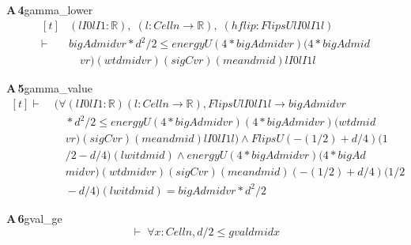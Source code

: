 \documentclass[conference]{IEEEtran}
\theoremstyle{definition}
\newcommand{\lean}[1]{\textsf{\footnotesize #1}}
\begin{document}
\noindent\textbf{A\,4}\quad\lean{gamma\_lower}
{\footnotesize\[ \begin{aligned}[t]
&(\mathit{lI0} \mathit{lI1} : \mathbb{R} ),\; (\mathit{l} : \mathit{Cell} \mathit{n} \to \mathbb{R} ),\; (\mathit{hflip} : \mathit{FlipsU} \mathit{lI0} \mathit{lI1} \mathit{l})\\
\vdash\;&\mathit{bigA} \mathit{d} \mathit{mid} \mathit{vr} * \mathit{d} ^{2} / 2 \leq \mathit{energyU} (4 * \mathit{bigA} \mathit{d} \mathit{mid} \mathit{vr}) (4 * \mathit{bigA} \mathit{d} \mathit{mid}\\
&\quad \mathit{vr}) (\mathit{wt} \mathit{d} \mathit{mid} \mathit{vr}) (\mathit{sigC} \mathit{vr}) (\mathit{mean} \mathit{d} \mathit{mid}) \mathit{lI0} \mathit{lI1} \mathit{l}
\end{aligned} \]}

\noindent\textbf{A\,5}\quad\lean{gamma\_value}
{\footnotesize\[ \begin{aligned}[t]
\vdash\;&(\forall (\mathit{lI0} \mathit{lI1} : \mathbb{R} ) (\mathit{l} : \mathit{Cell} \mathit{n} \to \mathbb{R} ), \mathit{FlipsU} \mathit{lI0} \mathit{lI1} \mathit{l} \to \mathit{bigA} \mathit{d} \mathit{mid} \mathit{vr}\\
&\quad * \mathit{d} ^{2} / 2 \leq \mathit{energyU} (4 * \mathit{bigA} \mathit{d} \mathit{mid} \mathit{vr}) (4 * \mathit{bigA} \mathit{d} \mathit{mid} \mathit{vr}) (\mathit{wt} \mathit{d} \mathit{mid}\\
&\quad \mathit{vr}) (\mathit{sigC} \mathit{vr}) (\mathit{mean} \mathit{d} \mathit{mid}) \mathit{lI0} \mathit{lI1} \mathit{l}) \wedge \mathit{FlipsU} (-(1/2) + \mathit{d}/4) (1\\
&\quad /2 - \mathit{d}/4) (\mathit{lwit} \mathit{d} \mathit{mid}) \wedge \mathit{energyU} (4 * \mathit{bigA} \mathit{d} \mathit{mid} \mathit{vr}) (4 * \mathit{bigA} \mathit{d}\\
&\quad \mathit{mid} \mathit{vr}) (\mathit{wt} \mathit{d} \mathit{mid} \mathit{vr}) (\mathit{sigC} \mathit{vr}) (\mathit{mean} \mathit{d} \mathit{mid}) (-(1/2) + \mathit{d}/4) (1/2\\
&\quad - \mathit{d}/4) (\mathit{lwit} \mathit{d} \mathit{mid}) = \mathit{bigA} \mathit{d} \mathit{mid} \mathit{vr} * \mathit{d} ^{2} / 2
\end{aligned} \]}

\noindent\textbf{A\,6}\quad\lean{gval\_ge}
{\footnotesize\[ \vdash\; \forall \mathit{x} : \mathit{Cell} \mathit{n}, \mathit{d} / 2 \leq \mathit{gval} \mathit{d} \mathit{mid} \mathit{x} \]}
\end{document}

